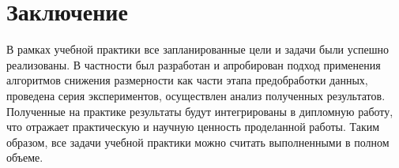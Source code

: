 \section{Заключение}
    В рамках учебной практики все запланированные цели и задачи были успешно реализованы. В частности был разработан и апробирован подход применения алгоритмов снижения размерности как части этапа предобработки данных, проведена серия экспериментов, осуществлен анализ полученных результатов. Полученные на практике результаты будут интегрированы в дипломную работу, что отражает практическую и научную ценность проделанной работы. Таким образом, все задачи учебной практики можно считать выполненными в полном объеме.
